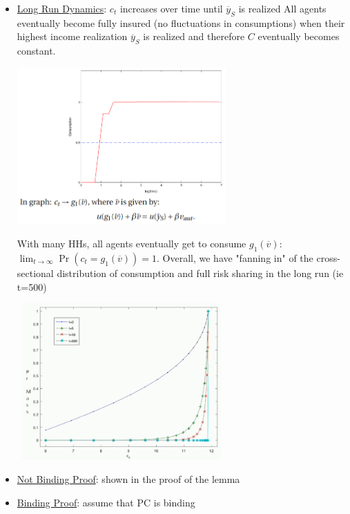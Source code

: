 \documentclass{article}
\begin{document}
\begin{itemize}
\begin{itemize}
\begin{itemize}
\begin{center}
                \end{center}
            \item \underline{Long Run Dynamics}: $c_{t}$ increases over time until $\overline{y}_{S}$ is realized
                All agents eventually become fully insured (no fluctuations in consumptions) when their highest income realization $\overline{y}_{S}$ is realized and therefore $C$ eventually becomes constant.
                \newline
                \begin{center}
                \includegraphics[width=8cm, height=6cm]{pic13}
                \end{center}
                With many HHs, all agents eventually get to consume $g_{1}(\overline{v})$: $\lim_{t \rightarrow \infty} \Pr(c_{t} = g_{1}(\overline{v})) = 1$. Overall, we have "fanning in" of the cross-sectional distribution of consumption and full risk sharing in the long run (ie t=500)
                \newline
                \begin{center}
                \includegraphics[width=8cm, height=6cm]{pic14}
                \end{center}
            \item  \underline{Not Binding Proof}: shown in the proof of the lemma
            \item  \underline{Binding Proof}: assume that PC is binding

\end{itemize}
\end{itemize}
\end{itemize}
\end{document}
